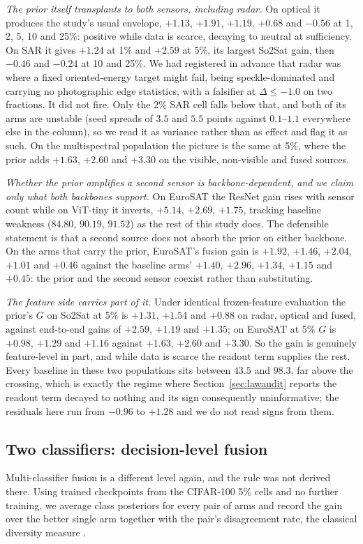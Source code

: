 \emph{The prior itself transplants to both sensors, including radar.} On
optical it produces the study's usual envelope, $+1.13$, $+1.91$, $+1.19$,
$+0.68$ and $-0.56$ at 1, 2, 5, 10 and 25\%: positive while data is scarce,
decaying to neutral at sufficiency. On SAR it gives $+1.24$ at 1\% and
$+2.59$ at 5\%, its largest So2Sat gain, then $-0.46$ and $-0.24$ at 10 and
25\%. We had registered in advance that radar was where a fixed
oriented-energy target might fail, being speckle-dominated and carrying no
photographic edge statistics, with a falsifier at $\Delta \le -1.0$ on two
fractions. It did not fire. Only the 2\% SAR cell falls below that, and
both of its arms are unstable (seed spreads of $3.5$ and $5.5$ points
against $0.1$--$1.1$ everywhere else in the column), so we read it as
variance rather than as effect and flag it as such. On the multispectral
population the picture is the same at 5\%, where the prior adds $+1.63$,
$+2.60$ and $+3.30$ on the visible, non-visible and fused sources.

\emph{Whether the prior amplifies a second sensor is
backbone-dependent, and we claim only what both backbones support.} On
EuroSAT the ResNet gain rises with sensor count while on ViT-tiny it
inverts, $+5.14$, $+2.69$, $+1.75$, tracking baseline weakness ($84.80$,
$90.19$, $91.52$) as the rest of this study does. The defensible statement
is that a second source does not absorb the prior on either backbone. On
the arms that carry the prior, EuroSAT's fusion gain is $+1.92$, $+1.46$,
$+2.04$, $+1.01$ and $+0.46$ against the baseline arms' $+1.40$, $+2.96$,
$+1.34$, $+1.15$ and $+0.45$: the prior and the second sensor coexist
rather than substituting.

\emph{The feature side carries part of it.} Under identical frozen-feature
evaluation the prior's $G$ on So2Sat at 5\% is $+1.31$, $+1.54$ and $+0.88$
on radar, optical and fused, against end-to-end gains of $+2.59$, $+1.19$
and $+1.35$; on EuroSAT at 5\% $G$ is $+0.98$, $+1.29$ and $+1.16$ against
$+1.63$, $+2.60$ and $+3.30$. So the gain is genuinely feature-level in
part, and while data is scarce the readout term supplies the rest. Every
baseline in these two populations sits between $43.5$ and $98.3$, far above
the crossing, which is exactly the regime where Section~\ref{sec:lawaudit}
reports the readout term decayed to nothing and its sign consequently
uninformative; the residuals here run from $-0.96$ to $+1.28$ and we do not
read signs from them.

\subsection{Two classifiers: decision-level fusion}\label{sec:decisionfusion}
Multi-classifier fusion is a different level again, and the rule was not
derived there. Using trained checkpoints from the CIFAR-100 5\% cells and
no further training, we average class posteriors for every pair of arms and
record the gain over the better single arm together with the pair's
disagreement rate, the classical diversity measure
\citep{brown2005diversity}.

